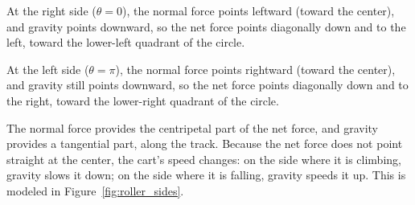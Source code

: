 At the right side ($\theta = 0$), the normal force points leftward (toward the center), and gravity points downward, so the net force points diagonally down and to the left, toward the lower-left quadrant of the circle.

At the left side ($\theta = \pi$), the normal force points rightward (toward the center), and gravity still points downward, so the net force points diagonally down and to the right, toward the lower-right quadrant of the circle.

The normal force provides the centripetal part of the net force, and
gravity provides a tangential part, along the track. Because the net force
does not point straight at the center, the cart's speed changes: on the
side where it is climbing, gravity slows it down; on the side where it is
falling, gravity speeds it up. This is modeled in Figure~\ref{fig:roller_sides}.

